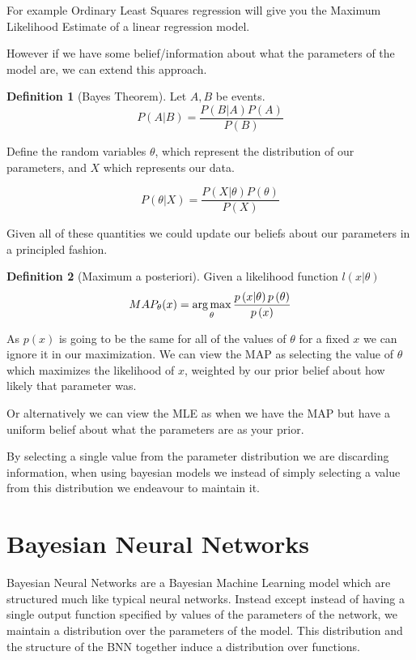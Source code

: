 \documentclass[12pt, a4paper]{report}
\theoremstyle{definition}
\theoremstyle{definition}
\newtheorem{definition}{Definition}[section]
\theoremstyle{definition}
\begin{document}
For example Ordinary Least Squares regression will give you the Maximum Likelihood Estimate of a linear regression model.

However if we have some belief/information about what the parameters of the model are, we can extend this approach.

\begin{definition}[Bayes Theorem]
    Let $A,B$ be events.
$$P \left( A | B\right) = \frac{P \left( B | A\right) P \left(A\right)}{P \left(B \right)}$$
\end{definition}


Define the random variables $\theta$, which represent the distribution of our parameters, and $X$ which represents our data.

$$P \left( \theta | X\right) = \frac{P \left( X | \theta \right) P \left( \theta\right)}{P \left( X  \right)}$$

Given all of these quantities we could update our beliefs about our parameters in a principled fashion.


\begin{definition}[Maximum a posteriori]
    Given a likelihood function $l(x | \theta)$
$$MAP_{\theta}(x) = \operatorname*{arg\,max}_{\theta}  \frac{p \left( x | \theta \right) p \left( \theta\right)}{p \left( x  \right)}$$
\end{definition}

As $p(x)$ is going to be the same for all of the values of $\theta$ for a fixed $x$ we can ignore it in our maximization. We can view the MAP as selecting the value of $\theta$ which maximizes the likelihood of $x$, weighted by our prior belief about how likely that parameter was.


Or alternatively we can view the MLE as when we have the MAP but have a uniform belief about what the parameters are as your prior.

By selecting a single value from the parameter distribution we are discarding information, when using bayesian models we instead of simply selecting a value from this distribution we endeavour to maintain it.


\section{Bayesian Neural Networks}
\label{sec:BNNs}


Bayesian Neural Networks are a Bayesian Machine Learning model which are structured much like typical neural networks. Instead except instead of having a single output function specified by values of the parameters of the network, we maintain a distribution over the parameters of the model. This distribution and the structure of the BNN together induce a distribution over functions.
\end{document}
